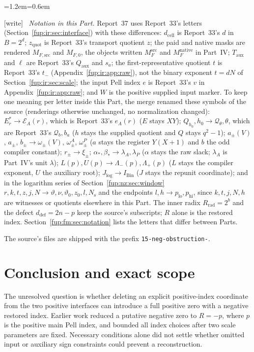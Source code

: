 \documentclass[11pt,letterpaper]{article}
\theoremstyle{definition}\newtheorem{definition}[theorem]{Definition}
\theoremstyle{remark}\newtheorem{remark}[theorem]{Remark}
\newcommand{\MFnat}{M_{F}^{\mathrm{native}}}
\newcommand{\MFsrc}{M_F^{\mathrm{src}}}
\newcommand{\Qa}{Q_{\mathrm{aux}}}
\newcommand{\ea}{e_A}
\newcommand{\dcell}{d_{\mathrm{cell}}}
\newcommand{\MFsrcV}{M_{F,\mathrm{src}}}
\newcommand{\MFnatV}{M_{F,0}}
\newcommand{\Taux}{T_{\mathrm{aux}}}\newcommand{\yaux}{y_{\mathrm{aux}}}
\newcommand{\zquot}{z_{\mathrm{quot}}}\newcommand{\ga}{g_a}
\newcommand{\wtag}{\textup{[write]}}
\newenvironment{writenote}{\par\smallskip\begin{list}{}{\leftmargin=1.2em\rightmargin=0.6em}\item[]\small\wtag\ }{\end{list}\smallskip}
\begin{document}
\begin{writenote}
\emph{Notation in this Part.} Report~37 uses Report~33's letters (Section~\ref{fup:ir:sec:interface}) with these differences: $\dcell$ is Report~33's $d$ in $B=2^d$; $\zquot$ is Report~33's transport quotient $z$; the paid and native masks are rendered $\MFsrcV$ and $\MFnatV$, the objects written $\MFsrc$ and $\MFnat$ in Part~IV; $\Taux$ and $\ell$ are Report~33's $\Qa$ and $s_a$; the first-representative quotient $t$ is Report~33's $t_-$ (Appendix~\ref{fup:ir:app:raw}), not the binary exponent $t=dN$ of Section~\ref{fup:ir:sec:scale}; the input Pell index $e$ is Report~33's $v$ in Appendix~\ref{fup:ir:app:raw}; and $W$ is the positive supplied input marker. To keep one meaning per letter inside this Part, the merge renamed these symbols of the source (renderings otherwise unchanged, no normalization changed): $E^*_r\to\mathcal E_A(r)$, which is Report~33's $\ea(r)$ ($E$ stays $XY$); $Q_{h_0},h_0\to\mathcal Q_\theta,\theta$, which are Report~33's $\mathcal Q_b,b_a$ ($h$ stays the supplied quotient and $Q$ stays $q^2-1$); $a_\pm(V)$, $a_\pm$, $b_\pm\to\omega_\pm(V)$, $\omega^A_\pm$, $\omega^P_\pm$ ($a$ stays the register $Y(X+1)$ and $b$ the odd compiler constant); $r_\pm\to\xi_\pm$; $\alpha_*,\beta_*\to\lambda_A,\lambda_P$ ($\alpha$ stays the raw slack; $\lambda_A$ is Part~IV's unit $\lambda$); $L(p),U(p)\to\Lambda_-(p),\Lambda_+(p)$ ($L$ stays the compiler exponent, $U$ the auxiliary root); $J_{\log}\to I_{\mathrm{Bin}}$ ($J$ stays the repunit coordinate); and in the logarithm series of Section~\ref{fup:nz:sec:window} $r,k,t,z,j,N\to\vartheta,\nu,\vartheta_0,z_0,l,N_{\mathrm s}$ and the endpoints $l,h\to p_{\mathrm{lo}},p_{\mathrm{hi}}$, since $k,t,j,N,h$ are witnesses or quotients elsewhere in this Part. The inner radix $R_{\mathrm{rad}}=2^b$ and the defect $d_{\mathrm{def}}=2n-p$ keep the source's subscripts; $R$ alone is the restored index. Section~\ref{fup:fm:sec:notation} lists the letters that differ between Parts.

The source's files are shipped with the prefix \texttt{15-neg-obstruction-}.
\end{writenote}

\section{Conclusion and exact scope}\label{fup:nz:sec:scope}
The unresolved question is whether deleting an explicit positive-index coordinate from the two positive interfaces can introduce a full positive zero with a negative restored index. Earlier work reduced a putative negative zero to $R=-p$, where $p$ is the positive main Pell index, and bounded all index choices after two scale parameters are fixed. Necessary conditions alone did not settle whether omitted input or auxiliary sign constraints could prevent a reconstruction.
\end{document}
